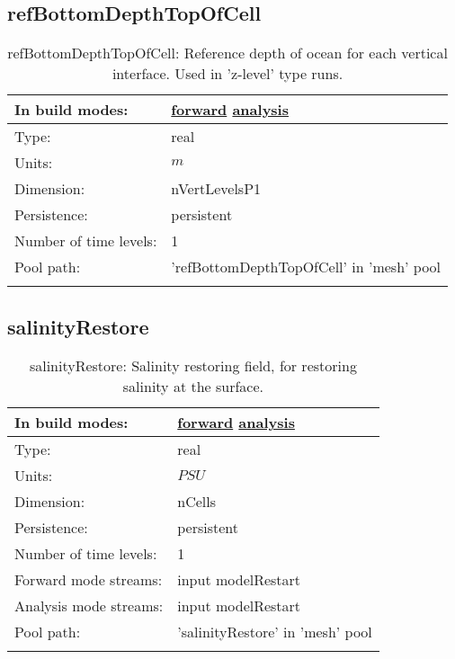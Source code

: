 \subsection[refBottomDepthTopOfCell]{refBottomDepthTopOfCell}
\label{subsec:var_sec_mesh_refBottomDepthTopOfCell}
\begin{center}
\begin{longtable}{| p{2.0in} | p{4.0in} |}
        \hline 
        In build modes: & \hyperref[subsec:forward_var_tab_mesh]{forward} \hyperref[subsec:analysis_var_tab_mesh]{analysis} \\
        \hline 
        Type: & real \\
        \hline 
        Units: & $m$ \\
        \hline 
        Dimension: & nVertLevelsP1 \\
        \hline 
        Persistence: & persistent \\
        \hline 
        Number of time levels: & 1 \\
        \hline 
            Pool path: & 'refBottomDepthTopOfCell' in 'mesh' pool
 \\
		 \hline 
    \caption{refBottomDepthTopOfCell: Reference depth of ocean for each vertical interface. Used in 'z-level' type runs.}
\end{longtable}
\end{center}
\subsection[salinityRestore]{salinityRestore}
\label{subsec:var_sec_mesh_salinityRestore}
\begin{center}
\begin{longtable}{| p{2.0in} | p{4.0in} |}
        \hline 
        In build modes: & \hyperref[subsec:forward_var_tab_mesh]{forward} \hyperref[subsec:analysis_var_tab_mesh]{analysis} \\
        \hline 
        Type: & real \\
        \hline 
        Units: & $PSU$ \\
        \hline 
        Dimension: & nCells \\
        \hline 
        Persistence: & persistent \\
        \hline 
        Number of time levels: & 1 \\
        \hline 
		 Forward mode streams: &  input modelRestart \\
        \hline 
		 Analysis mode streams: &  input modelRestart \\
        \hline 
            Pool path: & 'salinityRestore' in 'mesh' pool
 \\
		 \hline 
    \caption{salinityRestore: Salinity restoring field, for restoring salinity at the surface.}
\end{longtable}
\end{center}
